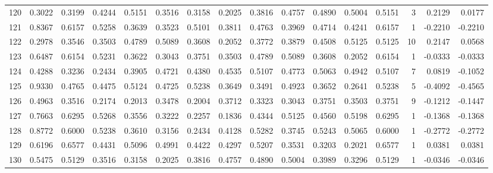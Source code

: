 \begin{tabular}{lrrrrrrrrrrrrrrr}
120 &      0.3022 &  0.3199 &  0.4244 &  0.5151 &  0.3516 &  0.3158 &  0.2025 &  0.3816 &  0.4757 &  0.4890 &   0.5004 &     0.5151 &      3 &                    0.2129 &                     0.0177 \\
121 &      0.8367 &  0.6157 &  0.5258 &  0.3639 &  0.3523 &  0.5101 &  0.3811 &  0.4763 &  0.3969 &  0.4714 &   0.4241 &     0.6157 &      1 &                   -0.2210 &                    -0.2210 \\
122 &      0.2978 &  0.3546 &  0.3503 &  0.4789 &  0.5089 &  0.3608 &  0.2052 &  0.3772 &  0.3879 &  0.4508 &   0.5125 &     0.5125 &     10 &                    0.2147 &                     0.0568 \\
123 &      0.6487 &  0.6154 &  0.5231 &  0.3622 &  0.3043 &  0.3751 &  0.3503 &  0.4789 &  0.5089 &  0.3608 &   0.2052 &     0.6154 &      1 &                   -0.0333 &                    -0.0333 \\
124 &      0.4288 &  0.3236 &  0.2434 &  0.3905 &  0.4721 &  0.4380 &  0.4535 &  0.5107 &  0.4773 &  0.5063 &   0.4942 &     0.5107 &      7 &                    0.0819 &                    -0.1052 \\
125 &      0.9330 &  0.4765 &  0.4475 &  0.5124 &  0.4725 &  0.5238 &  0.3649 &  0.3491 &  0.4923 &  0.3652 &   0.2641 &     0.5238 &      5 &                   -0.4092 &                    -0.4565 \\
126 &      0.4963 &  0.3516 &  0.2174 &  0.2013 &  0.3478 &  0.2004 &  0.3712 &  0.3323 &  0.3043 &  0.3751 &   0.3503 &     0.3751 &      9 &                   -0.1212 &                    -0.1447 \\
127 &      0.7663 &  0.6295 &  0.5268 &  0.3556 &  0.3222 &  0.2257 &  0.1836 &  0.4344 &  0.5125 &  0.4560 &   0.5198 &     0.6295 &      1 &                   -0.1368 &                    -0.1368 \\
128 &      0.8772 &  0.6000 &  0.5238 &  0.3610 &  0.3156 &  0.2434 &  0.4128 &  0.5282 &  0.3745 &  0.5243 &   0.5065 &     0.6000 &      1 &                   -0.2772 &                    -0.2772 \\
129 &      0.6196 &  0.6577 &  0.4431 &  0.5096 &  0.4991 &  0.4422 &  0.4297 &  0.5207 &  0.3531 &  0.3203 &   0.2021 &     0.6577 &      1 &                    0.0381 &                     0.0381 \\
130 &      0.5475 &  0.5129 &  0.3516 &  0.3158 &  0.2025 &  0.3816 &  0.4757 &  0.4890 &  0.5004 &  0.3989 &   0.3296 &     0.5129 &      1 &                   -0.0346 &                    -0.0346 \\

\end{tabular}
